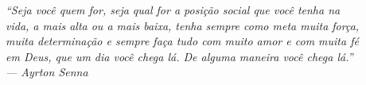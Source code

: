 \begin{epigrafe}
    \vspace*{\fill}
	\begin{flushright}
		\textit{``Seja você quem for, seja qual for a posição social que você tenha na \\vida, a mais alta ou a mais baixa, tenha sempre como meta muita força,\\ muita determinação e sempre faça tudo com muito amor e com muita fé\\ em Deus, que um dia você chega lá. De alguma maneira você chega lá.''}\\
		\textit{--- Ayrton Senna}
	\end{flushright}
\end{epigrafe}